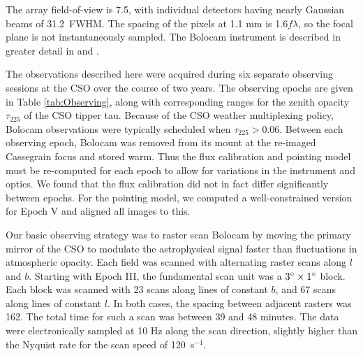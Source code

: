 \documentclass[12pt,preprint]{aastex}
\newcommand{\bcamfwhm}{31.2\arcsec}
\begin{document}
The array field-of-view is 7\arcmin.5, with individual detectors
having nearly Gaussian beams of \bcamfwhm\ FWHM.  The spacing of the
pixels at 1.1 mm is 1.6$f\lambda$, so the focal plane is not
instantaneously sampled.  The Bolocam instrument is described in greater
detail in \citet{haig04} and \citet{glenn03}.


The observations described here were acquired during six separate
observing sessions at the CSO over the course of two years.  The
observing epochs are given in Table \ref{tab:Observing}, along with
corresponding ranges for the zenith opacity $\tau_{225}$ of the CSO
tipper tau.  Because of the CSO weather multiplexing policy, Bolocam
observations were typically scheduled when $\tau_{225} > 0.06$.
Between each observing epoch, Bolocam was removed from its mount at
the re-imaged Cassegrain focus and stored warm.  Thus the flux
calibration and pointing model must be re-computed for each epoch to
allow for variations in the instrument and optics.  We found that the
flux calibration did not in fact differ significantly between epochs.
For the pointing model, we computed a well-constrained version for
Epoch V and aligned all images to this.



Our basic observing strategy was to raster scan Bolocam by moving the
primary mirror of the CSO to modulate the astrophysical signal faster
than fluctuations in atmospheric opacity.  Each field was scanned with
alternating raster scans along $l$ and $b$.  Starting with Epoch III,
the fundamental scan unit was a $3\mbox{$^\circ$} \times 1\mbox{$^\circ$}$ block.
Each block was scanned with 23 scans along lines of constant $b$, and
67 scans along lines of constant $l$.  In both cases, the spacing
between adjacent rasters was 162\arcsec.  The total time for such a
scan was between 39 and 48 minutes.  The data were electronically
sampled at 10 Hz along the scan direction, slightly higher than the
Nyquist rate for the scan speed of 120\arcsec\ s$^{-1}$.
\end{document}
